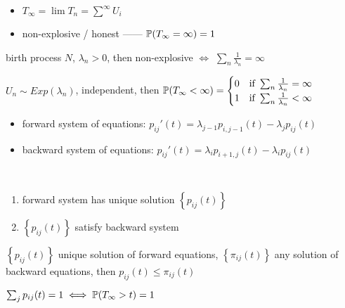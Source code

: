 \begin{itemize}
    \item $T_\infty = \lim T_n = \sum^\infty U_i$
    \item non-explosive / honest ------ $\mathbb{P}(T_\infty = \infty) = 1$
\end{itemize}

\begin{thm}
    birth process $N$, $\lambda_n > 0$, then non-explosive $\iff$ $\sum_n \frac{1}{\lambda_n} = \infty$
\end{thm}

\begin{lemma}
    $U_n \sim Exp(\lambda_n)$, independent, then $\mathbb{P}(T_\infty < \infty) = \begin{cases}
                                                     0 & \text{if } \sum_n \frac{1}{\lambda_n} = \infty\\
                                                     1 & \text{if } \sum_n \frac{1}{\lambda_n} < \infty\\
    \end{cases}$
\end{lemma}

\begin{itemize}
    \item forward system of equations: $p_{ij}'(t) = \lambda_{j-1}p_{i, j-1}(t) - \lambda_j p_{ij}(t)$
    \item backward system of equations: $p_{ij}'(t) = \lambda_i p_{i+1, j}(t) - \lambda_i p_{ij}(t)$
\end{itemize}

\begin{thm}\,
    \begin{enumerate}
        \item forward system has unique solution $\left\{ p_{ij}(t) \right\}$
        \item $\left\{ p_{ij}(t) \right\}$ satisfy backward system
    \end{enumerate}
\end{thm}

\begin{thm}
    $\left\{ p_{ij}(t) \right\}$ unique solution of forward equations, $\left\{ \pi_{ij}(t) \right\}$ any solution of backward equations, then
    $p_{ij}(t) \leq \pi_{ij}(t)$
\end{thm}

\begin{fact}
    $\sum_j p_{ij}(t) = 1 \iff \mathbb{P}(T_\infty > t) = 1$
\end{fact}

